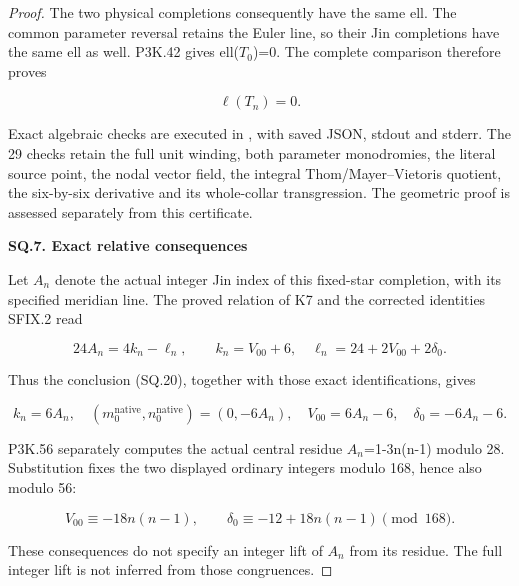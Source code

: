 \begin{proof}
The two physical completions consequently have the same ell.
The common parameter reversal retains the Euler line, so their
Jin completions have the same ell as well. P3K.42 gives ell(\(T_{0}\))=0.
The complete comparison therefore proves

\[
                              \ell(T_n)=0.              \tag{SQ.20}
\]

Exact algebraic checks are executed in , with saved JSON, stdout and stderr. The 29 checks retain the full unit winding, both parameter monodromies, the literal source point, the nodal vector field, the integral Thom/Mayer--Vietoris quotient, the six-by-six derivative and its whole-collar transgression. The geometric proof is assessed separately from this certificate.

\par

\medskip\noindent\textbf{SQ.7. Exact relative consequences}

\par\nobreak

Let \(A_{n}\) denote the actual integer Jin index of this fixed-star
completion, with its specified meridian line. The proved relation of
K7 and the corrected identities SFIX.2 read

\[
 24A_n=4k_n-\ell_n,\qquad
 k_n=V_{00}+6,\quad
 \ell_n=24+2V_{00}+2\delta_0.
\]

Thus the conclusion (SQ.20), together with those exact identifications,
gives

\[
 k_n=6A_n,\quad
 (m_0^{\mathrm{native}},n_0^{\mathrm{native}})=(0,-6A_n),
 \quad V_{00}=6A_n-6,\quad\delta_0=-6A_n-6.           \tag{SQ.21}
\]

P3K.56 separately computes the actual central residue
\(A_{n}\)=1-3n(n-1) modulo 28. Substitution fixes the two displayed
ordinary integers modulo 168, hence also modulo 56:

\[
 V_{00}\equiv-18n(n-1),\qquad
 \delta_0\equiv-12+18n(n-1)\pmod{168}.               \tag{SQ.22}
\]

These consequences do not specify an integer lift of \(A_{n}\) from its
residue. The full integer lift is not inferred from those congruences.
\end{proof}
